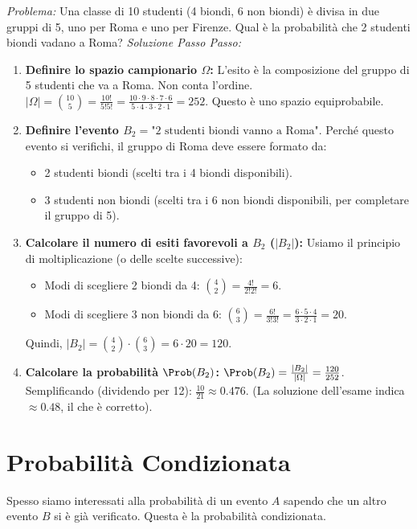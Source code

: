 \begin{example}
\textit{Problema:} Una classe di 10 studenti (4 biondi, 6 non biondi) è divisa in due gruppi di 5, uno per Roma e uno per Firenze. Qual è la probabilità che 2 studenti biondi vadano a Roma?
\textit{Soluzione Passo Passo:}
\begin{enumerate}
    \item \textbf{Definire lo spazio campionario $\Omega$:} L'esito è la composizione del gruppo di 5 studenti che va a Roma. Non conta l'ordine.
    $|\Omega| = \binom{10}{5} = \frac{10!}{5!5!} = \frac{10 \cdot 9 \cdot 8 \cdot 7 \cdot 6}{5 \cdot 4 \cdot 3 \cdot 2 \cdot 1} = 252$.
    Questo è uno spazio equiprobabile.
    \item \textbf{Definire l'evento $B_2 = \text{"2 studenti biondi vanno a Roma"}$}.
    Perché questo evento si verifichi, il gruppo di Roma deve essere formato da:
    \begin{itemize}
        \item 2 studenti biondi (scelti tra i 4 biondi disponibili).
        \item 3 studenti non biondi (scelti tra i 6 non biondi disponibili, per completare il gruppo di 5).
    \end{itemize}
    \item \textbf{Calcolare il numero di esiti favorevoli a $B_2$ ($|B_2|$):}
    Usiamo il principio di moltiplicazione (o delle scelte successive):
    \begin{itemize}
        \item Modi di scegliere 2 biondi da 4: $\binom{4}{2} = \frac{4!}{2!2!} = 6$.
        \item Modi di scegliere 3 non biondi da 6: $\binom{6}{3} = \frac{6!}{3!3!} = \frac{6 \cdot 5 \cdot 4}{3 \cdot 2 \cdot 1} = 20$.
    \end{itemize}
    Quindi, $|B_2| = \binom{4}{2} \cdot \binom{6}{3} = 6 \cdot 20 = 120$.
    \item \textbf{Calcolare la probabilità $\Prob(B_2)$:}
    $\Prob(B_2) = \frac{|B_2|}{|\Omega|} = \frac{120}{252}$.
    Semplificando (dividendo per 12): $\frac{10}{21} \approx 0.476$. (La soluzione dell'esame indica $\approx 0.48$, il che è corretto).
\end{enumerate}
\end{example}

\section{Probabilità Condizionata}
\label{sec:prob_cond}
Spesso siamo interessati alla probabilità di un evento $A$ sapendo che un altro evento $B$ si è già verificato. Questa è la probabilità condizionata.

